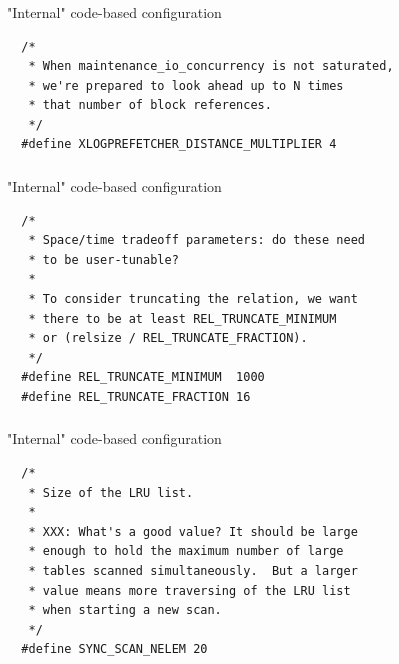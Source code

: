 \documentclass[usenames,dvipsnames, 18pt, compress, aspectratio=169]{beamer}
\begin{document}
\begin{frame}[fragile]{}
    \frametitle{}
    \begin{center}

        "Internal" code-based configuration

		\vspace{0.5cm}
        \begin{verbatim}
  /*
   * When maintenance_io_concurrency is not saturated,
   * we're prepared to look ahead up to N times
   * that number of block references.
   */
  #define XLOGPREFETCHER_DISTANCE_MULTIPLIER 4
        \end{verbatim}

    \end{center}
\end{frame}

\begin{frame}[fragile]{}
    \frametitle{}
    \begin{center}

        "Internal" code-based configuration

		\vspace{0.5cm}
        \begin{verbatim}
  /*
   * Space/time tradeoff parameters: do these need
   * to be user-tunable?
   *
   * To consider truncating the relation, we want
   * there to be at least REL_TRUNCATE_MINIMUM
   * or (relsize / REL_TRUNCATE_FRACTION).
   */
  #define REL_TRUNCATE_MINIMUM	1000
  #define REL_TRUNCATE_FRACTION	16
        \end{verbatim}

    \end{center}
\end{frame}

\begin{frame}[fragile]{}
    \frametitle{}
    \begin{center}

        "Internal" code-based configuration

		\vspace{0.5cm}
        \begin{verbatim}
  /*
   * Size of the LRU list.
   *
   * XXX: What's a good value? It should be large
   * enough to hold the maximum number of large
   * tables scanned simultaneously.  But a larger
   * value means more traversing of the LRU list
   * when starting a new scan.
   */
  #define SYNC_SCAN_NELEM 20
        \end{verbatim}

    \end{center}
\end{frame}
\end{document}
